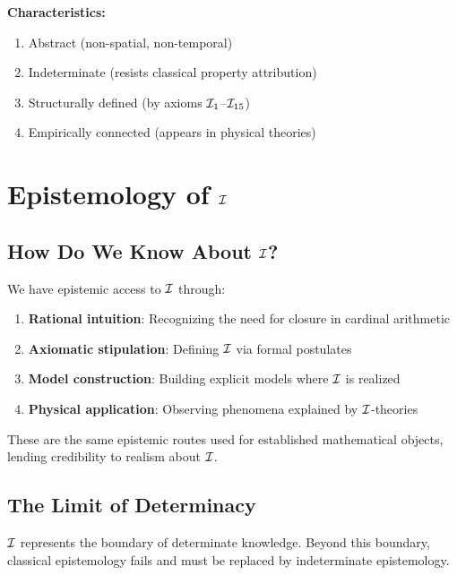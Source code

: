 \textbf{Characteristics:}
\begin{enumerate}
    \item Abstract (non-spatial, non-temporal)
    \item Indeterminate (resists classical property attribution)
    \item Structurally defined (by axioms $\mathcal{I}_1$--$\mathcal{I}_{15}$)
    \item Empirically connected (appears in physical theories)
\end{enumerate}

\section{Epistemology of $\mathcal{I}$}

\subsection{How Do We Know About $\mathcal{I}$?}

\begin{theorem}
We have epistemic access to $\mathcal{I}$ through:
\begin{enumerate}
    \item \textbf{Rational intuition}: Recognizing the need for closure in cardinal arithmetic
    \item \textbf{Axiomatic stipulation}: Defining $\mathcal{I}$ via formal postulates
    \item \textbf{Model construction}: Building explicit models where $\mathcal{I}$ is realized
    \item \textbf{Physical application}: Observing phenomena explained by $\mathcal{I}$-theories
\end{enumerate}
\end{theorem}

These are the same epistemic routes used for established mathematical objects, lending credibility to realism about $\mathcal{I}$.

\subsection{The Limit of Determinacy}

\begin{proposition}
$\mathcal{I}$ represents the boundary of determinate knowledge. Beyond this boundary, classical epistemology fails and must be replaced by indeterminate epistemology.
\end{proposition}

